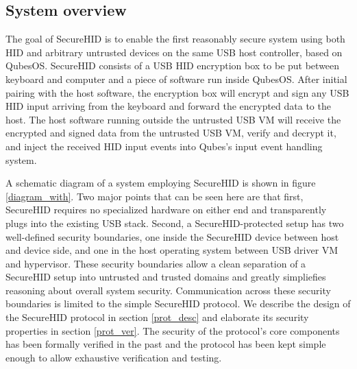 \documentclass[12pt,a4paper,notitlepage]{article}
\begin{document}
\subsection{System overview}
The goal of SecureHID is to enable the first reasonably secure system using both HID and arbitrary untrusted devices on
the same USB host controller, based on QubesOS. SecureHID consists of a USB HID encryption box to be put between
keyboard and computer and a piece of software run inside QubesOS. After initial pairing with the host software, the
encryption box will encrypt and sign any USB HID input arriving from the keyboard and forward the encrypted data to the
host. The host software running outside the untrusted USB VM will receive the encrypted and signed data from the
untrusted USB VM, verify and decrypt it, and inject the received HID input events into Qubes's input event handling
system.

A schematic diagram of a system employing SecureHID is shown in figure \ref{diagram_with}. Two major points that can be
seen here are that first, SecureHID requires no specialized hardware on either end and transparently plugs into the
existing USB stack. Second, a SecureHID-protected setup has two well-defined security boundaries, one inside the
SecureHID device between host and device side, and one in the host operating system between USB driver VM and
hypervisor.  These security boundaries allow a clean separation of a SecureHID setup into untrusted and trusted domains
and greatly simpliefies reasoning about overall system security.  Communication across these security boundaries is
limited to the simple SecureHID protocol. We describe the design of the SecureHID protocol in section \ref{prot_desc}
and elaborate its security properties in section \ref{prot_ver}. The security of the protocol's core components has been
formally verified in the past and the protocol has been kept simple enough to allow exhaustive verification and testing.
\end{document}
